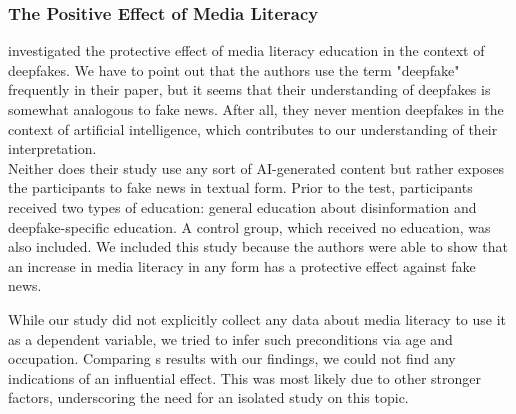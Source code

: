 \documentclass[
  a4paper,  %
  twoside,  %
  bibliography=totoc,
  headsepline,
  cleardoublepage=empty,
  parskip=half,
  draft=false
]{scrbook}
\begin{document}
\subsubsection*{The Positive Effect of Media Literacy}
\citeauthor{hwangEffectsDisinformationUsing2021} investigated the protective effect of media literacy education in the context of deepfakes. We have to point out that the authors use the term "deepfake" frequently in their paper, but it seems that their understanding of deepfakes is somewhat analogous to fake news. After all, they never mention deepfakes in the context of artificial intelligence, which contributes to our understanding of their interpretation. \\
Neither does their study use any sort of AI-generated content but rather exposes the participants to fake news in textual form. Prior to the test, participants received two types of education: general education about disinformation and deepfake-specific education. A control group, which received no education, was also included. We included this study because the authors were able to show that an increase in media literacy in any form has a protective effect against fake news.

While our study did not explicitly collect any data about media literacy to use it as a dependent variable, we tried to infer such preconditions via age and occupation. Comparing \citeauthor{hwangEffectsDisinformationUsing2021}s results with our findings, we could not find any indications of an influential effect. This was most likely due to other stronger factors, underscoring the need for an isolated study on this topic.
\end{document}
